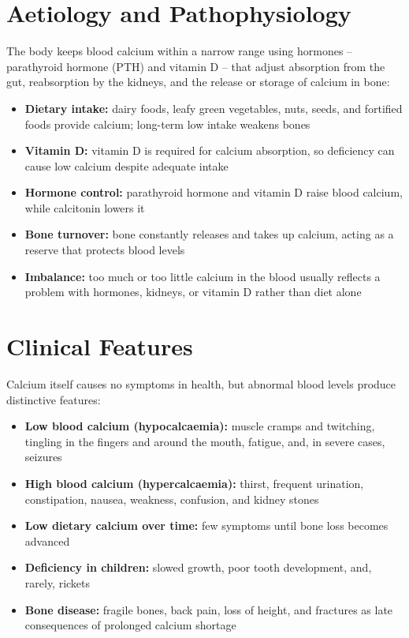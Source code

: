 \section*{Aetiology and Pathophysiology}
The body keeps blood calcium within a narrow range using hormones -- parathyroid hormone (PTH) and vitamin D -- that adjust absorption from the gut, reabsorption by the kidneys, and the release or storage of calcium in bone:
\begin{itemize}
    \item \textbf{Dietary intake:} dairy foods, leafy green vegetables, nuts, seeds, and fortified foods provide calcium; long-term low intake weakens bones
    \item \textbf{Vitamin D:} vitamin D is required for calcium absorption, so deficiency can cause low calcium despite adequate intake
    \item \textbf{Hormone control:} parathyroid hormone and vitamin D raise blood calcium, while calcitonin lowers it
    \item \textbf{Bone turnover:} bone constantly releases and takes up calcium, acting as a reserve that protects blood levels
    \item \textbf{Imbalance:} too much or too little calcium in the blood usually reflects a problem with hormones, kidneys, or vitamin D rather than diet alone
\end{itemize}

\section*{Clinical Features}
Calcium itself causes no symptoms in health, but abnormal blood levels produce distinctive features:
\begin{itemize}
    \item \textbf{Low blood calcium (hypocalcaemia):} muscle cramps and twitching, tingling in the fingers and around the mouth, fatigue, and, in severe cases, seizures
    \item \textbf{High blood calcium (hypercalcaemia):} thirst, frequent urination, constipation, nausea, weakness, confusion, and kidney stones
    \item \textbf{Low dietary calcium over time:} few symptoms until bone loss becomes advanced
    \item \textbf{Deficiency in children:} slowed growth, poor tooth development, and, rarely, rickets
    \item \textbf{Bone disease:} fragile bones, back pain, loss of height, and fractures as late consequences of prolonged calcium shortage
\end{itemize}


